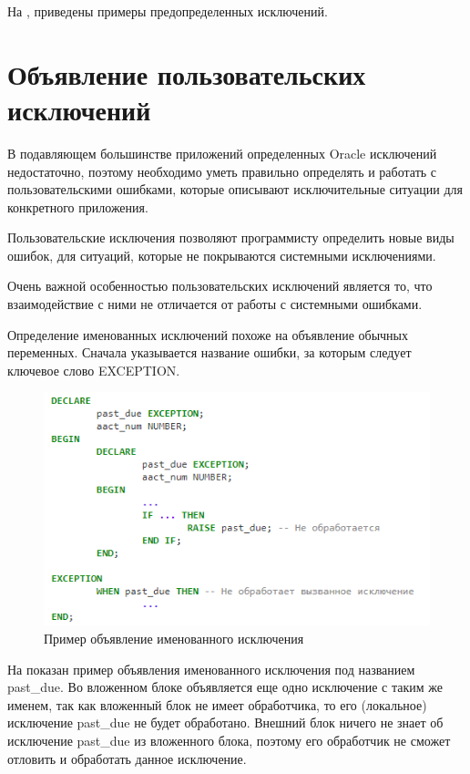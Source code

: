 На , приведены примеры предопределенных исключений. 

\section{Объявление пользовательских исключений}\label{ch1:sec2_1}
В подавляющем большинстве приложений определенных Oracle исключений недостаточно, поэтому необходимо уметь правильно определять и работать с пользовательскими ошибками, которые описывают исключительные ситуации для конкретного приложения.

Пользовательские исключения позволяют программисту определить новые виды ошибок, для ситуаций, которые не покрываются системными исключениями. 

Очень важной особенностью пользовательских исключений является то, что взаимодействие с ними не отличается от работы с системными ошибками. 

Определение именованных исключений похоже на объявление обычных переменных. Сначала указывается название ошибки, за которым следует ключевое слово EXCEPTION. 

\begin{figure}[ht!] 
	\center
	\includegraphics [scale=1] {my_folder/img/C1_exeception_declaration}
	\caption{Пример объявление именованного исключения} 
	\label{fig:C1_exeception_declaration}  
\end{figure}
\FloatBarrier

На  показан пример объявления именованного исключения под названием past\_due. Во вложенном блоке объявляется еще одно исключение с таким же именем, так как вложенный блок не имеет обработчика, то его (локальное) исключение past\_due не будет обработано. Внешний блок ничего не знает об исключение past\_due из вложенного блока, поэтому его обработчик не сможет отловить и обработать данное исключение\cite{handling-errors}.

